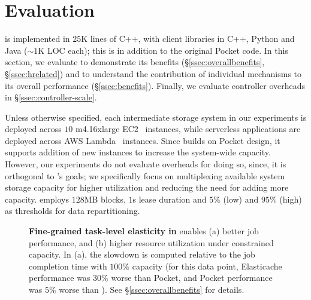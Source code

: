\section{Evaluation}
\label{sec:jiffyevaluation}
\jiffy is implemented in $25$K lines of C++, with client libraries in C++, Python and Java (${\sim}1$K LOC each); this is in addition to the original Pocket code. In this section, we evaluate \jiffy to demonstrate its benefits (\S\ref{ssec:overallbenefits}, \S\ref{ssec:hrelated}) and to understand the contribution of individual \jiffy mechanisms to its overall performance (\S\ref{ssec:benefits}). Finally, we evaluate \jiffy controller overheads in \S\ref{ssec:controller-scale}.

 Unless otherwise specified, each intermediate storage system in our experiments is deployed across $10$ m4.16xlarge EC2~\cite{ec2} instances, while serverless applications are deployed across AWS Lambda~\cite{ec2} instances. Since \jiffy builds on Pocket design, it supports addition of new instances to increase the system-wide capacity. However, our experiments do not evaluate overheads for doing so, since, it is orthogonal to \jiffy's goals; we specifically focus on multiplexing available system storage capacity for higher utilization and reducing the need for adding more capacity. \jiffy employs $128$MB blocks, $1$s lease duration and $5\%$ (low) and $95\%$ (high) as thresholds for data repartitioning. 

\begin{figure}[t]
  \centering
  \caption[Fine-grained task-level elasticity in \jiffy]{\textbf{Fine-grained task-level elasticity in \jiffy} enables (a) better job performance, and (b) higher resource utilization under constrained capacity. In (a), the slowdown is computed relative to the job completion time with $100\%$ capacity (for this data point, Elasticache performance was $30\%$ worse than Pocket, and Pocket performance was $5\%$ worse than \jiffy). See \S\ref{ssec:overallbenefits} for details.}
  \label{fig:elasticity}\vspace{-1.25em}
\end{figure}


